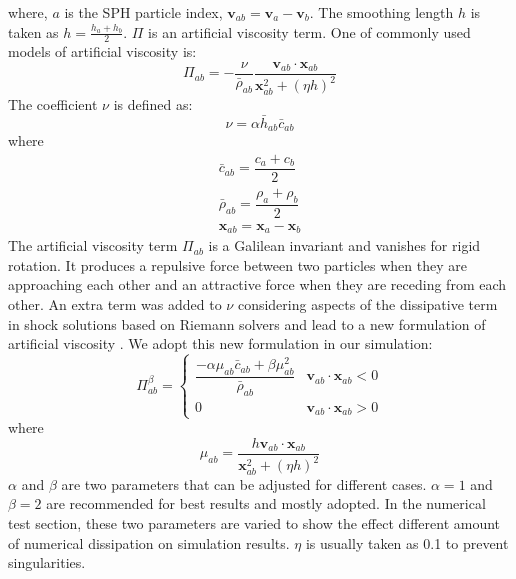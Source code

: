 where, $a$ is the SPH particle index, $\textbf{v}_{a b} = \textbf{v}_a - \textbf{v}_b$. The smoothing length $h$ is taken as $h=\frac{h_a + h_b}{2}$. $\Pi$ is an artificial viscosity term.
One of commonly used models of artificial viscosity \citep{monaghan1983shock} is:
\begin{equation}
\Pi_{ab}=- \frac{\nu}{\bar{\rho}_{ab}} \dfrac{ \textbf{v}_{ab} \cdot \textbf{x}_{ab}}{\textbf{x}_{ab}^2 + \left(\eta h\right)^2}
\label{eq:art-vis-original}
\end{equation}
The coefficient $\nu$ is defined as:
\begin{equation}
\nu = \alpha \bar{h}_{ab} \bar{c}_{ab}
\end{equation}
where 
\begin{align}
\bar{c}_{ab} = \dfrac{c_a + c_b}{2} \\
\bar{\rho}_{ab} = \dfrac{\rho_a + \rho_b}{2} \\
\textbf{x}_{ab}=\textbf{x}_a-\textbf{x}_b
\end{align}
The artificial viscosity term $\Pi_{ab}$ is a Galilean invariant and vanishes for rigid rotation. It produces a repulsive force between two particles when they are approaching each other and an attractive force when they are receding from each other.
An extra term was added to $\nu$ considering aspects of the dissipative term in shock solutions based on Riemann solvers and lead to a new formulation of artificial viscosity \citep{monaghan1992smoothed}. We adopt this new formulation in our simulation:
\begin{equation}
\Pi_{ab}^{\beta} = 
\begin{cases} 
      \dfrac{- \alpha \mu_{ab} \bar{c}_{ab} + \beta \mu_{ab}^2} {\bar{\rho}_{ab}} & \textbf{v}_{ab} \cdot \textbf{x}_{ab} < 0\\
      0 & \textbf{v}_{ab} \cdot \textbf{x}_{ab} > 0
\end{cases}
\label{eq:art-vis-shock}
\end{equation}
where
\begin{equation}
\mu_{ab} = \dfrac{h \textbf{v}_{ab} \cdot \textbf{x}_{ab}}{\textbf{x}_{ab}^2 + \left(\eta h\right)^2} 
\end{equation}
$\alpha$ and $\beta$ are two parameters that can be adjusted for different cases.
$\alpha = 1$ and $\beta = 2$ are recommended \citep{monaghan2005smoothed} for best results and mostly adopted. In the numerical test section, these two parameters are varied to show the effect different amount of numerical dissipation on simulation results. $\eta$ is usually taken as 0.1 to prevent singularities.

